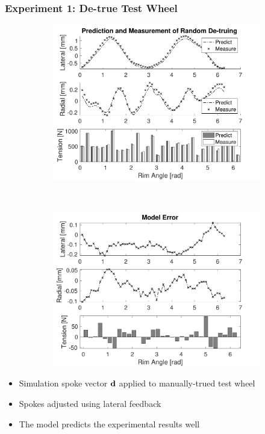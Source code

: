 \documentclass[mathserif]{beamer}
\begin{document}
\begin{frame}
\frametitle{Experiment 1: De-true Test Wheel}
\begin{figure}
        \centering
        \begin{subfigure}[b]{0.45\textwidth}
            \includegraphics[width=\textwidth]{./figs/exp1}
        \end{subfigure}
        ~
        \begin{subfigure}[b]{0.45\textwidth}
            \includegraphics[width=\textwidth]{./figs/exp1_err}
        \end{subfigure}
\end{figure}
\begin{itemize}
    \item Simulation spoke vector $\bf d$ applied to manually-trued test wheel
    \item Spokes adjusted using lateral feedback
    \item The model predicts the experimental results well
\end{itemize}
\end{frame}
\end{document}
